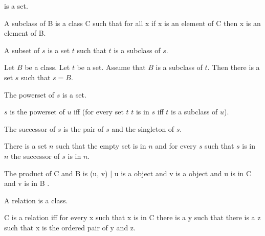 \documentclass{article}
\begin{document}
\begin{forthel}
    \begin{lemma}
       is a set.
    \end{lemma}

    \begin{definition}
      A subclass of B is a class C such that
        for all x if x is an element of C then x is an element of B.
    \end{definition}

    \begin{definition}
      A subset of $s$ is a set $t$ 
        such that $t$ is a subclass of $s$.
    \end{definition}

    \begin{axiom}[Separation]
      Let $B$ be a class. Let $t$ be a set.
      Assume that $B$ is a subclass of $t$.
      Then there is a set $s$ such that $s = B$.
    \end{axiom}

    \begin{signature}
      The powerset of $s$ is a set.
    \end{signature}

    \begin{axiom}[PowerSet]
      $s$ is the powerset of $u$ iff (for every set $t$ $t$ is in $s$ iff $t$ is a subclass of $u$).
    \end{axiom}

    \begin{definition}
      The successor of $s$ is the pair of $s$ and the singleton of $s$.
    \end{definition}

    \begin{axiom}[Inf]
      There is a set $n$ such that the empty set is in $n$ and for every $s$
        such that $s$ is in $n$ the successor of $s$ is in $n$.
    \end{axiom}

    \begin{definition}
      The product of C and B is { (u, v) | u is a object and v is a object and u is in C and v is in B }.
    \end{definition}

    \begin{signature}
      A relation is a class.
    \end{signature}

    \begin{axiom}[RelationIntro]
      C is a relation iff for every x such that x is in C
        there is a y such that there is a z such that x is the ordered pair of y and z.
    \end{axiom}


\end{forthel}
\end{document}
